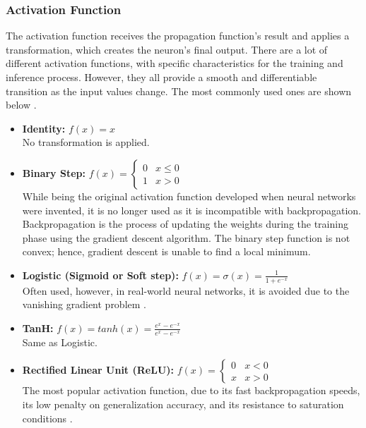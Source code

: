 \subsubsection{Activation Function}
\label{sec:Activation-Function}
The activation function receives the propagation function's result and applies a transformation, which creates the neuron's final output. There are a lot of different activation functions, with specific characteristics for the training and inference process. However, they all provide a smooth and differentiable transition as the input values change. The most commonly used ones are shown below \cite{Activation-Function-Wikipedia}.
\begin{itemize}
	\item \textbf{Identity:} $f(x) = x$\\
	No transformation is applied.

	\item \textbf{Binary Step:} $
		      f(x) =
		      \begin{cases}
			      0 & x \leq 0 \\
			      1 & x > 0
		      \end{cases}
		  $\\
		  While being the original activation function developed when neural networks were invented, it is no longer used as it is incompatible with backpropagation. Backpropagation is the process of updating the weights during the training phase using the gradient descent algorithm. The binary step function is not convex; hence, gradient descent is unable to find a local minimum.

	\item \textbf{Logistic (Sigmoid or Soft step):} $
		      f(x) = \sigma(x) = \frac{1}{1 + e^{-x}}
		  $\\
		  Often used, however, in real-world neural networks, it is avoided due to the vanishing gradient problem \cite{The-Vanishing-Gradient-Problem-During-Learning-Recurrent-Neural-Nets-and-Problem-Solutions}.

	\item \textbf{TanH:} $
		      f(x) = tanh(x) = \frac{e^{x} - e^{-x}}{e^{x} - e^{-x}}
		  $\\
		  Same as Logistic.

	\item \textbf{Rectified Linear Unit (ReLU):} $
		      f(x) =
		      \begin{cases}
			      0 & x < 0 \\
			      x & x > 0
		      \end{cases}
		  $\\
		  The most popular activation function, due to its fast backpropagation speeds, its low penalty on generalization accuracy, and its resistance to saturation conditions \cite{ImageNet-Classification-Using-Binary-Convolutional-Neural-Networks}.


\end{itemize}
